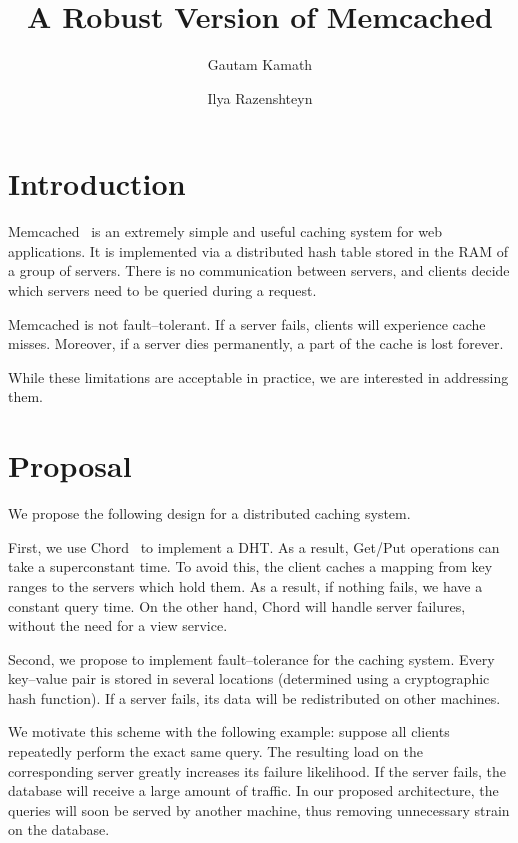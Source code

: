 \documentclass[letterpaper,11pt]{article}
\begin{document}
    \title{A Robust Version of Memcached}
    \author{Gautam Kamath \and Ilya Razenshteyn}
    \maketitle

    \section{Introduction}

    Memcached~\cite{memcached} is an extremely simple and useful caching system for web applications. It is implemented
    via a distributed hash table stored in the RAM of a group of servers.
    There is no communication between servers, and clients decide which servers need to be queried during a request.

    Memcached is not fault--tolerant.
    If a server fails, clients will experience cache misses. 
    Moreover, if a server dies permanently, a part of the cache is lost forever.

    While these limitations are acceptable in practice, we are interested in addressing them.

    \section{Proposal}

    We propose the following design for a distributed caching system.

    First, we use Chord~\cite{chord} to implement a DHT.
    As a result, Get/Put operations can take a superconstant time. To avoid this, the client caches
    a mapping from key ranges to the servers which hold them. As a result, if nothing fails, we have a
    constant query time. On the other hand, Chord will handle server failures, without the need for a view service.

    Second, we propose to implement fault--tolerance for the caching system. Every key--value pair is stored in
    several locations (determined using a cryptographic hash function).
    If a server fails, its data will be redistributed on other machines.

    We motivate this scheme with the following example: suppose all clients repeatedly perform the exact same query.
    The resulting load on the corresponding server greatly increases its failure likelihood.
    If the server fails, the database will receive a large amount of traffic.
    In our proposed architecture, the queries will soon be served by another machine, thus removing unnecessary strain on the database.



\end{document}
